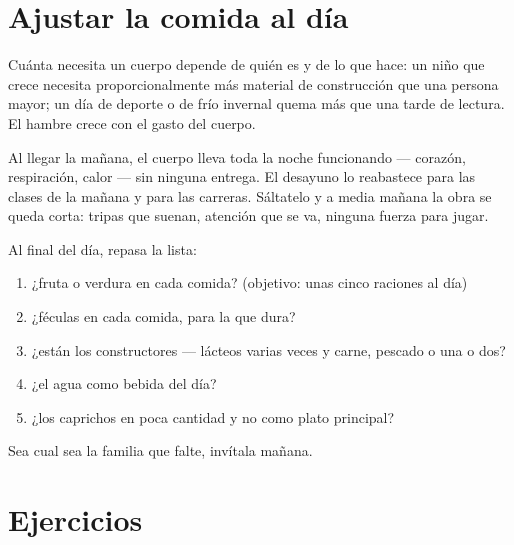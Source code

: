 \section{Ajustar la comida al día}

\begin{proposition}\label{prop:g3:balanced-diet:needs}
Cuánta  necesita un cuerpo depende de quién es y de lo que
hace: un niño que crece necesita proporcionalmente más material de
construcción que una persona mayor; un día de deporte o de frío
invernal quema más  que una tarde de lectura. El hambre crece
con el gasto del cuerpo.
\end{proposition}
\admitted

\begin{example}\label{ex:g3:balanced-diet:breakfast}
Al llegar la mañana, el cuerpo lleva toda la noche funcionando ---
corazón, respiración, calor --- sin ninguna entrega. El desayuno lo
reabastece para las clases de la mañana y para las carreras. Sáltatelo
y a media mañana la obra se queda corta: tripas que suenan, atención
que se va, ninguna fuerza para jugar.
\end{example}

\begin{method}\label{met:g3:balanced-diet:check}
Al final del día, repasa la lista:
\begin{enumerate}
  \item ¿fruta o verdura en cada comida? (objetivo: unas cinco
        raciones al día)
  \item ¿féculas en cada comida, para la  que dura?
  \item ¿están los constructores --- lácteos varias veces y carne,
        pescado o  una o dos?
  \item ¿el agua como bebida del día?
  \item ¿los caprichos en poca cantidad y no como plato principal?
\end{enumerate}
Sea cual sea la familia que falte, invítala mañana.
\end{method}

\section{Ejercicios}

